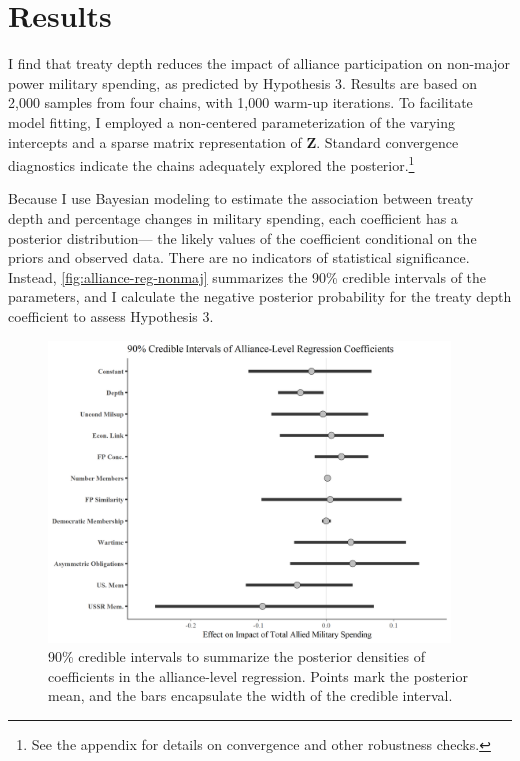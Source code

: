 \documentclass[12pt]{article}
\begin{document}
 

\section{Results}


I find that treaty depth reduces the impact of alliance participation on non-major power military spending, as predicted by Hypothesis 3. 
Results are based on 2,000 samples from four chains, with 1,000 warm-up iterations. 
To facilitate model fitting, I employed a non-centered parameterization of the varying intercepts and a sparse matrix representation of \textbf{Z}. 
Standard convergence diagnostics indicate the chains adequately explored the posterior.\footnote{See the appendix for details on convergence and other robustness checks.} 


Because I use Bayesian modeling to estimate the association between treaty depth and percentage changes in military spending, each coefficient has a posterior distribution--- the likely values of the coefficient conditional on the priors and observed data.
There are no indicators of statistical significance. 
Instead, \autoref{fig:alliance-reg-nonmaj} summarizes the 90\% credible intervals of the parameters, and I calculate the negative posterior probability for the treaty depth coefficient to assess Hypothesis 3.


\begin{figure}[htbp]
	\centering
		\includegraphics[width=0.95\textwidth]{../figures/alliance-reg-nonmaj.png}
	\caption{90\% credible intervals to summarize the posterior densities of coefficients in the alliance-level regression. Points mark the posterior mean, and the bars encapsulate the width of the credible interval.}
	\label{fig:alliance-reg-nonmaj}
\end{figure}
\end{document}
